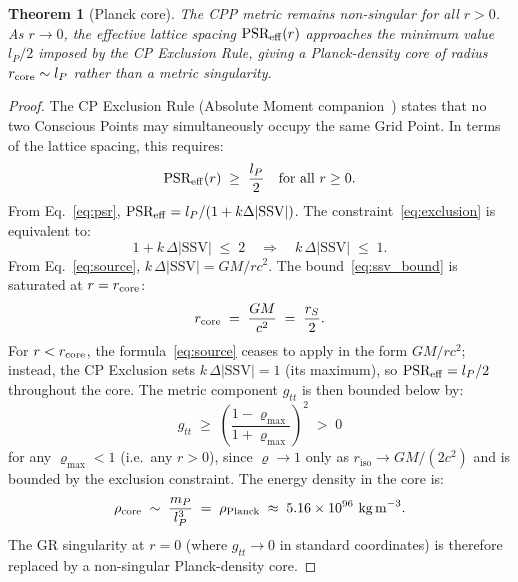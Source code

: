 \documentclass[12pt]{article}
\newtheorem{theorem}{Theorem}[section]
\newcommand{\lP}{l_P}
\newcommand{\mP}{m_P}
\newcommand{\SSV}{\text{SSV}}
\newcommand{\PSR}{\text{PSR}}
\newcommand{\riso}{r_{\mathrm{iso}}}
\newcommand{\vrho}{\varrho}   %
\begin{document}
\begin{theorem}[Planck core]
\label{thm:core}
The CPP metric remains non-singular for all $r > 0$.  As $r \to 0$,
the effective lattice spacing $\PSR_{\rm eff}(r)$ approaches the
minimum value $\lP/2$ imposed by the CP Exclusion Rule, giving a
Planck-density core of radius $r_{\rm core} \sim \lP$ rather than
a metric singularity.
\end{theorem}

\begin{proof}
The CP Exclusion Rule (Absolute Moment companion~\cite{c1}) states
that no two Conscious Points may simultaneously occupy the same Grid
Point.  In terms of the lattice spacing, this requires:
\begin{equation}
  \PSR_{\rm eff}(r) \;\geq\; \frac{\lP}{2}
  \quad\text{for all } r \geq 0.
  \label{eq:exclusion}
\end{equation}
From Eq.~\eqref{eq:psr}, $\PSR_{\rm eff} = \lP/(1 + k\Delta|\SSV|)$.
The constraint~\eqref{eq:exclusion} is equivalent to:
\begin{equation}
  1 + k\,\Delta|\SSV| \;\leq\; 2
  \quad\Longrightarrow\quad
  k\,\Delta|\SSV| \;\leq\; 1.
  \label{eq:ssv_bound}
\end{equation}
From Eq.~\eqref{eq:source}, $k\,\Delta|\SSV| = GM/rc^2$.  The
bound~\eqref{eq:ssv_bound} is saturated at $r = r_{\rm core}$:
\begin{equation}
  r_{\rm core} \;=\; \frac{GM}{c^2} \;=\; \frac{r_S}{2}.
  \label{eq:r_core}
\end{equation}
For $r < r_{\rm core}$, the formula~\eqref{eq:source} ceases to apply
in the form $GM/rc^2$; instead, the CP Exclusion sets
$k\,\Delta|\SSV| = 1$ (its maximum), so $\PSR_{\rm eff} = \lP/2$
throughout the core.  The metric component $g_{tt}$ is then
bounded below by:
\begin{equation}
  g_{tt} \;\geq\; \left(\frac{1 - \vrho_{\max}}{1 + \vrho_{\max}}\right)^{\!2}
  \;>\; 0
  \label{eq:gtt_bound}
\end{equation}
for any $\vrho_{\max} < 1$ (i.e.\ any $r > 0$), since $\vrho \to 1$
only as $\riso \to GM/(2c^2)$ and is bounded by the exclusion
constraint.  The energy density in the core is:
\begin{equation}
  \rho_{\rm core} \;\sim\; \frac{\mP}{\lP^3}
  \;=\; \rho_{\rm Planck}
  \;\approx\; 5.16\times 10^{96}\ \text{kg\,m}^{-3}.
  \label{eq:planck_density}
\end{equation}
The GR singularity at $r = 0$ (where $g_{tt} \to 0$ in standard
coordinates) is therefore replaced by a non-singular Planck-density
core.
\end{proof}
\end{document}
